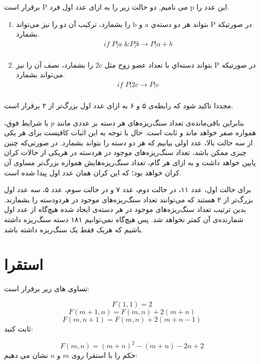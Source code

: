 \documentclass[11pt,largemargins]{h2wp}
\begin{document}
   
      این عدد را 
      $\mathrm{p}$
      می نامیم,    
    دو حالت زیر را به ازای عدد اول فرد 
    $\mathrm{P}$
    برقرار است.
    \begin{enumerate}
        \item 
        در صورتیکه
        $\mathrm{P}$
        بتواند هر دو دسته‌ي 
        $\mathrm{a}$
        و
        $\mathrm{b}$
         را بشمارد، ترکیب آن دو را نیز می‌تواند بشمارد.
        \begin{align} 
            if\; P|a\;\& P|b \to P|a+b \\ \nonumber
        \end{align}
        \item 
        در صورتیکه
        $\mathrm{P}$
        بتواند دسته‌اي با تعداد عضو زوج مثل 
        $\mathrm{2c}$
         را بشمارد، نصف آن را نیز می‌تواند بشمارد.
        \begin{align} 
            if\;P|2c \to P|c \\ \nonumber
        \end{align}
    \end{enumerate}
    مجددا تاکید شود که رابطه‌ی ۵ و ۶ به ازای عدد اول بزرگ‌تر از ۲ برقرار است.
    
    
    بنابراین باقی‌مانده‌ی تعداد سنگ‌ریزه‌های هر دسته بر عددی مانند
    $p$
    با شرایط فوق، همواره صفر خواهد ماند و ثابت است.
    حال با توجه به این اثبات کافیست برای هر یکی از سه حالت بالا، عدد اولی بیابیم که هر دو دسته را بتواند بشمارد.
    در صورتی‌که چنین چیزی ممکن باشد، تعداد سنگ‌ریزه‌های موجود در هردسته در هریکی از حالات کران پایین خواهد داشت و به ازای هر گام، تعداد سنگ‌ریزه‌هایش همواره بزرگ‌تر مساوی آن کران خواهد بود؛
    که این کران همان عدد اول پیدا شده است.
    
    
    برای حالت اول، عدد ۱۱، در حالت دوم، عدد ۷ و در حالت سوم، عدد ۵، سه عدد اول بزرگ‌تر از ۲ هستند که می‌توانند تعداد سنگ‌ریزه‌های موجود در هردودسته را بشمارند.
    بدین ترتیب تعداد سنگ‌ریزه‌های موجود در هر دسته‌‌ی ایجاد شده هیچ‌گاه از عدد اول شمارنده‌ی آن کمتر نخواهد شد.
    پس هیچ‌گاه نمی‌توانیم ۱۸۱ دسته سنگ‌ریزه داشته باشیم که هریک فقط یک سنگ‌ریزه داشته باشد.

 \chapter*{استقرا}
 \question
 تساوی های زیر برقرار است:
 
\[F(1,1)=2\]
\[F(m+1,n)=F(m,n)+2(m+n)\]
\[F(m,n+1)=F(m,n)+2(m+n-1)\]
  ثابت کنید:
  
 \[F(m,n)=(m+n)^2-(m+n)-2n+2\]
\solution
حکم را با استقرا روی $m$
و
$n$
 نشان می دهیم:
\end{document}
